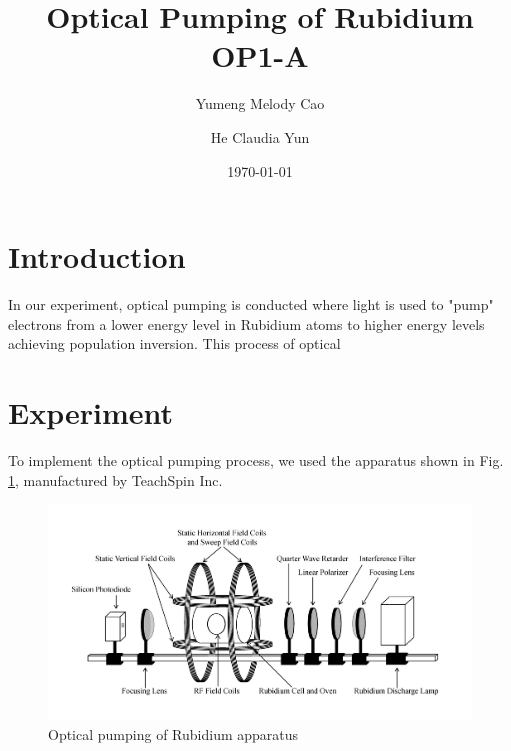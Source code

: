 \documentclass[prb,preprint]{revtex4-1}
\begin{document}
\title{Optical Pumping of Rubidium OP1-A}

\author{Yumeng Melody Cao}
\author{He Claudia Yun}


\date{\today}


\begin{abstract}

\end{abstract}

\maketitle 

\section{Introduction}

In our experiment, optical pumping is conducted where light is used to "pump" electrons from a lower energy level in Rubidium atoms to higher energy levels achieving population inversion. This process of optical 

\section{Experiment}

To implement the optical pumping process, we used the apparatus shown in Fig. 
\ref{exp}, manufactured by TeachSpin Inc. \\

\begin{figure}[h]
\centering
\includegraphics[width=18cm]{exp.jpg}
\caption{Optical pumping of Rubidium apparatus}
\label{exp}
\end{figure}
\end{document}
